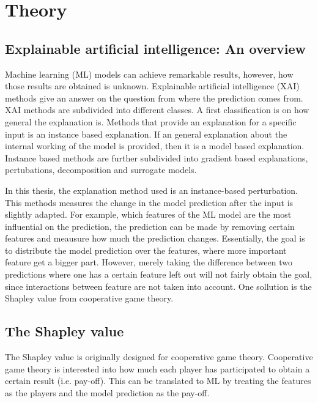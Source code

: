 \documentclass[twoside,twocolumn,9pt]{article}
\begin{document}
\section{Theory}

\subsection{Explainable artificial intelligence: An overview}

Machine learning (ML) models can achieve remarkable results, however, how
those results are obtained is unknown. Explainable artificial intelligence
(XAI) methods give an answer on the question from where the prediction comes
from.\cite{} XAI methods are subdivided into different classes. A first
classification is on how general the explanation is. Methods that provide an
explanation for a specific input is an instance based explanation.\cite{}
If an general explanation about the internal working of the model is provided,
then it is a model based explanation.\cite{} Instance based methods are
further subdivided into gradient based explanations, pertubations, decomposition
and surrogate models.\cite{}

In this thesis, the explanation method used is an instance-based perturbation.
This methods measures the change in the model prediction after the input is slightly
adapted.\cite{} For example, which features of the ML model are the most influential
on the prediction, the prediction can be made by removing certain features and meausure
how much the prediction changes. Essentially, the goal is to distribute the model prediction
over the features, where more important feature get a bigger part. However, merely taking
the difference between two predictions where one has a certain feature left out will not
fairly obtain the goal, since interactions between feature are not taken into account.
One sollution is the Shapley value from cooperative game theory.\cite{}

\subsection{The Shapley value}

The Shapley value is originally designed for cooperative game theory.\cite{} Cooperative
game theory is interested into how much each player has participated to obtain a certain
result (i.e. pay-off).\cite{} This can be translated to ML by treating the features as the players
and the model prediction as the pay-off.\cite{}
\end{document}
